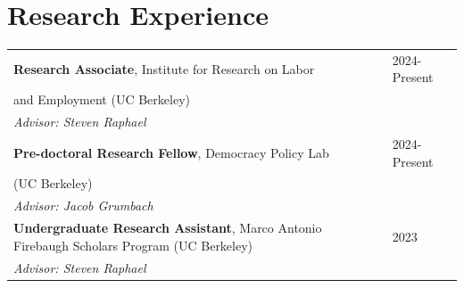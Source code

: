 
\section{\sc Research Experience}
\begin{tabular}{@{}p{4.25in}p{2in}}

{\bf{Research Associate}}, Institute for Research on Labor & 2024-Present \\ and Employment (UC Berkeley)  \\
\textit{Advisor: Steven Raphael} \\ 

{\bf{Pre-doctoral Research Fellow}}, Democracy Policy Lab & 2024-Present \\ (UC Berkeley)  \\
\textit{Advisor: Jacob Grumbach}  \\

{\bf{Undergraduate Research Assistant}}, Marco Antonio Firebaugh Scholars Program (UC Berkeley) & 2023 \\
\textit{Advisor: Steven Raphael} \\

\end{tabular}

\endinput
